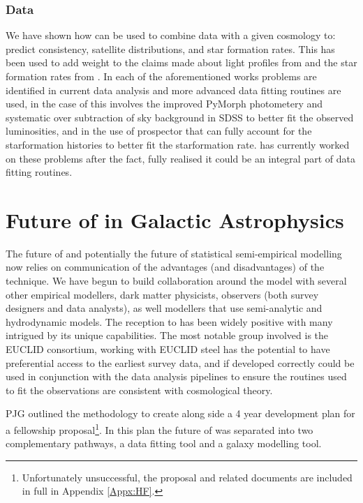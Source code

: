 \subsubsection{Data}

We have shown how \steel can be used to combine data with a given cosmology to: predict consistency, satellite distributions, and star formation rates. This has been used to add weight to the claims made about light profiles from \citet{Bernardi2017ComparingLight} and the star formation rates from \citet{Leja2019AnSurvey}. In each of the aforementioned works problems are identified in current data analysis and more advanced data fitting routines are used, in the case of \citet{Bernardi2017ComparingLight} this involves the improved PyMorph photometery and systematic over subtraction of sky background in SDSS to better fit the observed luminosities, and in \citet{Leja2019AnSurvey} the use of prospector that can fully account for the starformation histories to better fit the starformation rate. \steel has currently worked on these problems after the fact, fully realised it could be an integral part of data fitting routines.

\section{Future of \steel in Galactic Astrophysics}

The future of \steel and potentially the future of statistical semi-empirical modelling now relies on communication of the advantages (and disadvantages) of the technique. We have begun to build collaboration around the model with several other empirical modellers, dark matter physicists, observers (both survey designers and data analysts), as well modellers that use semi-analytic and hydrodynamic models. The reception to \steel has been widely positive with many intrigued by its unique capabilities. The most notable group involved is the EUCLID consortium, working with EUCLID steel has the potential to have preferential access to the earliest survey data, and if developed correctly could be used in conjunction with the data analysis pipelines to ensure the routines used to fit the observations are consistent with cosmological theory.

PJG outlined the methodology to create \steel along side a 4 year development plan for a fellowship proposal\footnote{Unfortunately unsuccessful, the proposal and related documents are included in full in Appendix \ref{Appx:HF}.}. In this plan the future of \steel was separated into two complementary pathways, a data fitting tool and a galaxy modelling tool. 

